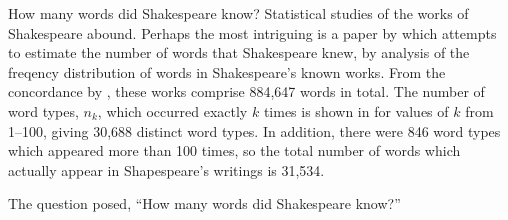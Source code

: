 \begin{Example}[shakewds]{How many words did Shakespeare know?}
Statistical studies of the works of Shakespeare abound.  Perhaps the
most intriguing is a paper by \citet{EfronThisted:76}
which attempts to estimate the
number of words that Shakespeare knew, by 
analysis of the freqency distribution of words in Shakespeare's
known works.
From the concordance by \citet{Spevack:68}, these works comprise
884,647 words in total.  The number of word types, $n_k$, which occurred
exactly $k$ times is shown in  for values of
$k$ from 1--100, giving 30,688 distinct word types. In addition, there were 846 word types which appeared
more than 100 times, so the total number of words which actually
appear in Shapespeare's writings is 31,534.


The question posed, ``How many words did Shakespeare know?''
\end{Example}